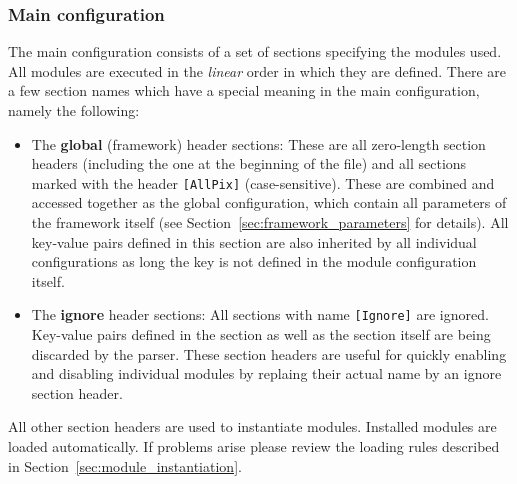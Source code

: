 \subsubsection{Main configuration}
\label{sec:main_config}
The main configuration consists of a set of sections specifying the modules used.
All modules are executed in the \emph{linear} order in which they are defined.
There are a few section names which have a special meaning in the main configuration, namely the following:
\begin{itemize}
\item The \textbf{global} (framework) header sections: These are all zero-length section headers (including the one at the beginning of the file) and all sections marked with the header \texttt{[AllPix]} (case-sensitive).
These are combined and accessed together as the global configuration, which contain all parameters of the framework itself (see Section~\ref{sec:framework_parameters} for details).
All key-value pairs defined in this section are also inherited by all individual configurations as long the key is not defined in the module configuration itself.
\item The \textbf{ignore} header sections: All sections with name \texttt{[Ignore]} are ignored.
Key-value pairs defined in the section as well as the section itself are being discarded by the parser.
These section headers are useful for quickly enabling and disabling individual modules by replaing their actual name by an ignore section header.
\end{itemize}

All other section headers are used to instantiate modules.
Installed modules are loaded automatically.
If problems arise please review the loading rules described in Section~\ref{sec:module_instantiation}.

